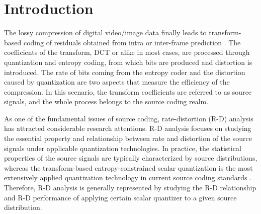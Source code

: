 \documentclass[smallabstract,smallcaptions]{dccpaper}
\begin{document}
\section{Introduction}

\let\thefootnote\relax{}

The lossy compression of digital video/image data finally leads to transform-based coding of residuals obtained from intra or inter-frame prediction \cite{Sullivan_IEEE2005}. The coefficients of the transform, DCT or alike in most cases, are processed through quantization and entropy coding, from which bits are produced and distortion is introduced. The rate of bits coming from the entropy coder and the distortion caused by quantization are two aspects that measure the efficiency of the compression. In this scenario, the transform coefficients are referred to as source signals, and the whole process belongs to the source coding realm.

As one of the fundamental issues of source coding, rate-distortion (R-D) analysis has attracted considerable research attentions. R-D analysis focuses on studying the essential property and relationship between rate and distortion of the source signals under applicable quantization technologies. In practice, the statistical properties of the source signals are typically characterized by source distributions, whereas the transform-based entropy-constrained scalar quantization is the most extensively applied quantization technology in current source coding standards \cite{Hang_TCSVT1997}. Therefore, R-D analysis is generally represented by studying the R-D relationship and R-D performance of applying certain scalar quantizer to a given source distribution.
\end{document}

